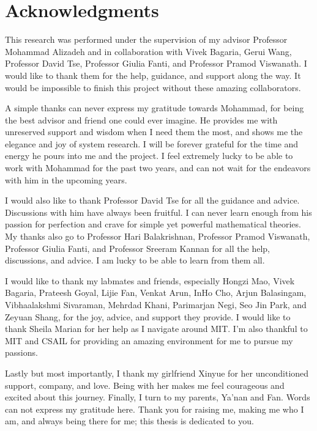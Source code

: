 % 

\cleardoublepage

\section*{Acknowledgments}

This research was performed under the supervision of my advisor Professor Mohammad Alizadeh and in collaboration with Vivek Bagaria, Gerui Wang, Professor David Tse, Professor Giulia Fanti, and Professor Pramod Viswanath. I would like to thank them for the help, guidance, and support along the way. It would be impossible to finish this project without these amazing collaborators.

A simple thanks can never express my gratitude towards Mohammad, for being the best advisor and friend one could ever imagine. He provides me with unreserved support and wisdom when I need them the most, and shows me the elegance and joy of system research. I will be forever grateful for the time and energy he pours into me and the project. I feel extremely lucky to be able to work with Mohammad for the past two years, and can not wait for the endeavors with him in the upcoming years.

I would also like to thank Professor David Tse for all the guidance and advice. Discussions with him have always been fruitful. I can never learn enough from his passion for perfection and crave for simple yet powerful mathematical theories. My thanks also go to Professor Hari Balakrishnan, Professor Pramod Viswanath, Professor Giulia Fanti, and Professor Sreeram Kannan for all the help, discussions, and advice. I am lucky to be able to learn from them all.

I would like to thank my labmates and friends, especially Hongzi Mao, Vivek Bagaria, Prateesh Goyal, Lijie Fan, Venkat Arun, InHo Cho, Arjun Balasingam, Vibhaalakshmi Sivaraman, Mehrdad Khani, Parimarjan Negi, Seo Jin Park, and Zeyuan Shang, for the joy, advice, and support they provide. I would like to thank Sheila Marian for her help as I navigate around MIT. I'm also thankful to MIT and CSAIL for providing an amazing environment for me to pursue my passions.

Lastly but most importantly, I thank my girlfriend Xinyue for her unconditioned support, company, and love. Being with her makes me feel courageous and excited about this journey. Finally, I turn to my parents, Ya'nan and Fan. Words can not express my gratitude here. Thank you for raising me, making me who I am, and always being there for me; this thesis is dedicated to you.


